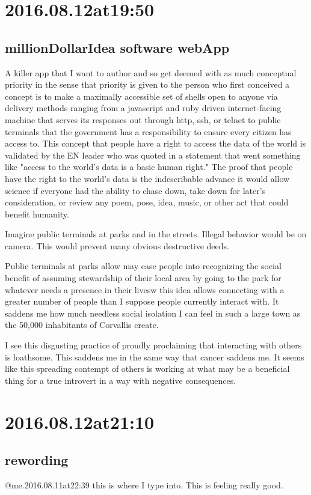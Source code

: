 \section*{ 2016.08.12at19:50 }
\subsection*{millionDollarIdea software webApp}
A killer app that I want to author and so get deemed with as much conceptual priority in the sense that priority is given to the person who first conceived a concept is to make a maximally accessible set of shells open to anyone via delivery methods ranging from a javascript and ruby driven internet-facing machine that serves its responses out through http, ssh, or telnet to public terminals that the government has a responsibility to ensure every citizen has access to. This concept that people have a right to access the data of the world is validated by the EN leader who was quoted in a statement that went something like "access to the world's data is a basic human right." The proof that people have the right to the world's data is the indescribable advance it would allow science if everyone had the ability to chase down, take down for later's consideration, or review any poem, pose, idea, music, or other act that could benefit humanity. 

Imagine public terminals at parks and in the streets. Illegal behavior would be on camera. This would prevent many obvious destructive deeds.

Public terminals at parks allow may ease people into recognizing the social benefit of assuming stewardship of their local area by going to the park for whatever needs a presence in their livesw this idea allows connecting with a greater number of people than I suppose people currently interact with. It saddens me how much needless social isolation I can feel in such a large town as the 50,000 inhabitants of Corvallis create.

I see this disgusting practice of proudly proclaiming that interacting with others is loathsome. This saddens me in the same way that cancer saddens me. It seems like this spreading contempt of others is working at what may be a beneficial thing for a true introvert in a way with negative consequences.

\section*{ 2016.08.12at21:10 }
\subsection*{rewording}
@me.2016.08.11at22:39
this is where I type into. This is feeling really good.

